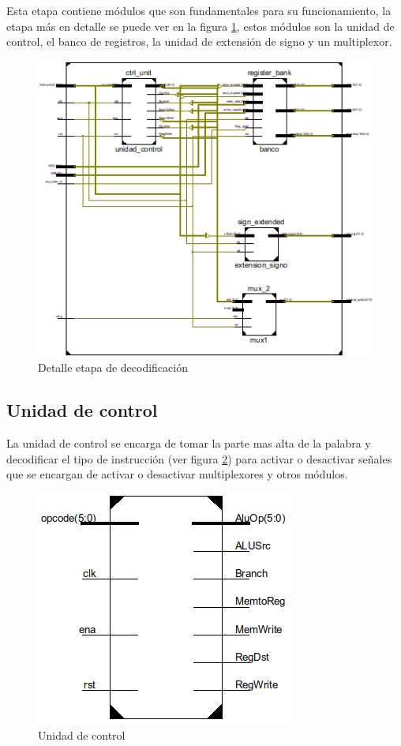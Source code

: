 Esta etapa contiene m\'odulos que son fundamentales para su funcionamiento, la etapa m\'as en detalle se puede ver en la figura \ref{fig:decodedetail}, estos m\'odulos son la unidad de control, el banco de registros, la unidad de extensi\'on de signo y un multiplexor.

\begin{figure}[H]
\centering
\includegraphics[scale=0.7]{img/decode_stage_inside}
\caption{Detalle etapa de decodificaci\'on}
\label{fig:decodedetail}
\end{figure} 

\subsection{Unidad de control}
La unidad de control se encarga de tomar la parte mas alta de la palabra y decodificar el tipo de instrucci\'on (ver figura \ref{fig:ctrl_unit}) para activar o desactivar señales que se encargan de activar o desactivar multiplexores y otros m\'odulos.

\begin{figure}[H]
\centering
\includegraphics[scale=0.5]{img/unidad_control}
\caption{Unidad de control}
\label{fig:ctrl_unit}
\end{figure} 

